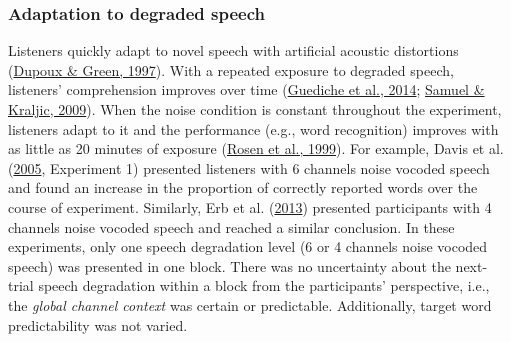 \documentclass[a4paper, nobind]{templates/ociamthesis}
\begin{document}
\hypertarget{adaptation-to-degraded-speech}{%
\subsubsection{Adaptation to degraded speech}\label{adaptation-to-degraded-speech}}

\noindent
Listeners quickly adapt to novel speech with artificial acoustic distortions (\protect\hyperlink{ref-Dupoux1997}{Dupoux \& Green, 1997}).
With a repeated exposure to degraded speech, listeners' comprehension improves over time (\protect\hyperlink{ref-Guediche2014}{Guediche et al., 2014}; \protect\hyperlink{ref-Samuel2009}{Samuel \& Kraljic, 2009}).
When the noise condition is constant throughout the experiment, listeners adapt to it and the performance (e.g., word recognition) improves with as little as 20 minutes of exposure (\protect\hyperlink{ref-Rosen1999}{Rosen et al., 1999}).
For example, Davis et al. (\protect\hyperlink{ref-Davis2005}{2005}, Experiment 1) presented listeners with 6 channels noise vocoded speech and found an increase in the proportion of correctly reported words over the course of experiment.
Similarly, Erb et al. (\protect\hyperlink{ref-Erb2013}{2013}) presented participants with 4 channels noise vocoded speech and reached a similar conclusion.
In these experiments, only one speech degradation level (6 or 4 channels noise vocoded speech) was presented in one block.
There was no uncertainty about the next-trial speech degradation within a block from the participants' perspective,
i.e., the \emph{global channel context} was certain or predictable.
Additionally, target word predictability was not varied.
\end{document}
